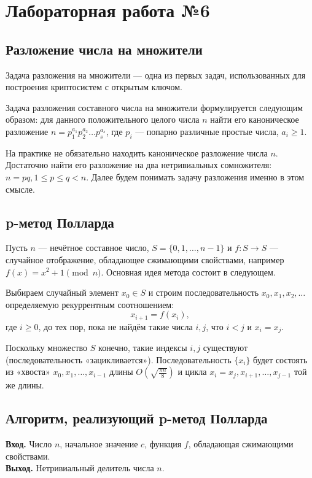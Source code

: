 \section*{Лабораторная работа №6}
\subsection*{Разложение числа на множители}

Задача разложения на множители — одна из первых задач, использованных для построения криптосистем с открытым ключом.

Задача разложения составного числа на множители формулируется следующим образом: для данного положительного целого числа $n$ найти его каноническое разложение $n = p_1^{a_1}p_2^{a_2} \ldots p_s^{a_s}$, где $p_i$ — попарно различные простые числа, $a_i \geq 1$.

На практике не обязательно находить каноническое разложение числа $n$. Достаточно найти его разложение на два нетривиальных сомножителя: $n = pq, 1 \leq p \leq q < n$. Далее будем понимать задачу разложения именно в этом смысле.

\subsection*{p-метод Полларда}
Пусть $n$ — нечётное составное число, $S = \{0, 1, \ldots, n-1\}$ и $f : S \to S$ — случайное отображение, обладающее сжимающими свойствами, например $f(x) = x^2 + 1 \pmod{n}$. Основная идея метода состоит в следующем.

Выбираем случайный элемент $x_0 \in S$ и строим последовательность $x_0, x_1, x_2, \ldots$ определяемую рекуррентным соотношением:
\[
x_{i+1} = f(x_i),
\]
где $i \geq 0$, до тех пор, пока не найдём такие числа $i, j$, что $i < j$ и $x_i = x_j$.

Поскольку множество $S$ конечно, такие индексы $i, j$ существуют (последовательность «зацикливается»). Последовательность $\{x_i\}$ будет состоять из «хвоста» $x_0, x_1, \ldots, x_{i-1}$ длины $O\left(\sqrt{\frac{\pi n}{8}}\right)$ и цикла $x_i = x_j, x_{i+1}, \ldots, x_{j-1}$ той же длины.

\subsection*{Алгоритм, реализующий p-метод Полларда}
\textbf{Вход.} Число $n$, начальное значение $c$, функция $f$, обладающая сжимающими свойствами. \\
\textbf{Выход.} Нетривиальный делитель числа $n$.

